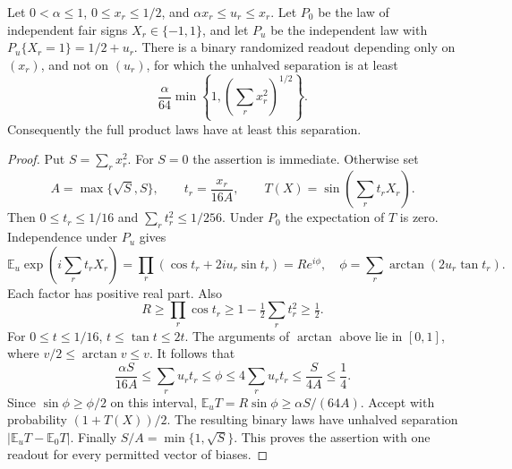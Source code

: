 \begin{lemma}\label{lem:unequalsignals89}
Let $0<\alpha\le1$, $0\le x_r\le1/2$, and
$\alpha x_r\le u_r\le x_r$.  Let $P_0$ be the law of independent
fair signs $X_r\in\{-1,1\}$, and let $P_u$ be the independent law
with $P_u\{X_r=1\}=1/2+u_r$.  There is a binary randomized readout
depending only on $(x_r)$, and not on $(u_r)$, for which the unhalved
separation is at least
\begin{equation}\label{eq:unequalsignals89}
 \frac{\alpha}{64}\min\left\{1,
                         \left(\sum_r x_r^2\right)^{1/2}\right\}.
\end{equation}
Consequently the full product laws have at least this separation.
\end{lemma}
\begin{proof}
Put $S=\sum_r x_r^2$.  For $S=0$ the assertion is immediate.
Otherwise set
\[
 A=\max\{\sqrt S,S\},\qquad
 t_r=\frac{x_r}{16A},\qquad
 T(X)=\sin\left(\sum_r t_rX_r\right).
\]
Then $0\le t_r\le1/16$ and $\sum_r t_r^2\le1/256$.
Under $P_0$ the expectation of $T$ is zero.  Independence under $P_u$
gives
\[
 \mathbb E_u\exp\left(i\sum_r t_rX_r\right)
 =\prod_r(\cos t_r+2iu_r\sin t_r)=R e^{i\phi},
 \quad \phi=\sum_r\arctan(2u_r\tan t_r).
\]
Each factor has positive real part.  Also
\[
 R\ge\prod_r\cos t_r
 \ge1-\tfrac12\sum_r t_r^2\ge\tfrac12.
\]
For $0\le t\le1/16$, $t\le\tan t\le2t$.  The arguments of
$\arctan$ above lie in $[0,1]$, where $v/2\le\arctan v\le v$.
It follows that
\[
 \frac{\alpha S}{16A}\le\sum_r u_rt_r\le\phi
 \le4\sum_r u_rt_r\le\frac{S}{4A}\le\frac14.
\]
Since $\sin\phi\ge\phi/2$ on this interval,
$\mathbb E_uT=R\sin\phi\ge\alpha S/(64A)$.
Accept with probability $(1+T(X))/2$.  The resulting binary laws
have unhalved separation $|\mathbb E_uT-\mathbb E_0T|$.
Finally $S/A=\min\{1,\sqrt S\}$.  This proves the assertion with
one readout for every permitted vector of biases.
\end{proof}

